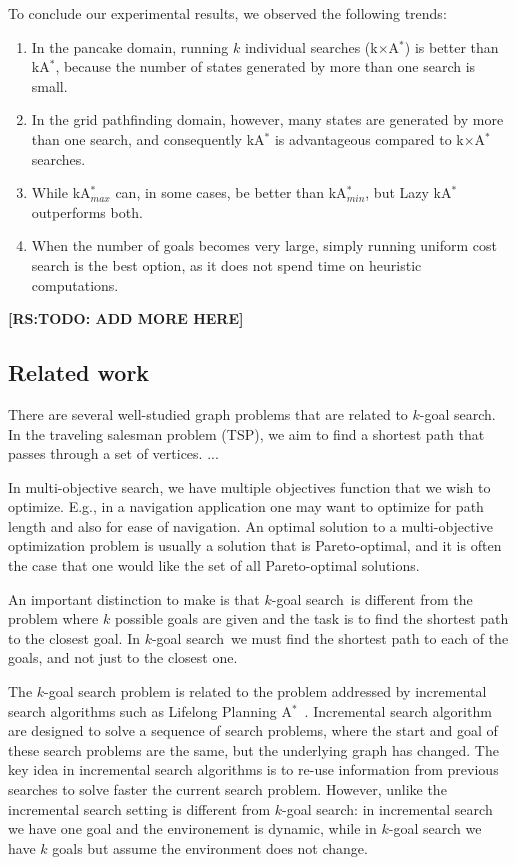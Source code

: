 \documentclass{aicom2e}
\newcommand{\kgs}{$k$-goal search}
\newcommand{\astar}{A$^*$}
\newcommand{\kastar}{kA$^*$}
\newcommand{\kastarmin}{kA$^*_{min}$}
\newcommand{\kastarmax}{kA$^*_{max}$}
\newcommand{\kxastar}{k$\times$A$^*$}
\newcommand{\roni}[1]{\textbf{[RS:#1]}}
\begin{document}
To conclude our experimental results, we observed the following trends:
\begin{enumerate}
	\item In the pancake domain, running $k$ individual searches (\kxastar{}) is better than \kastar{}, because the number of states generated by more than one search is small.
	\item In the grid pathfinding domain, however, many states are generated by more than one search, and consequently \kastar{} is advantageous compared to \kxastar{} searches. 
	\item While \kastarmax{} can, in some cases, be better than \kastarmin{}, but Lazy \kastar{} outperforms both. 
	\item When the number of goals becomes very large, simply running uniform cost search is the best option, as it does not spend time on heuristic computations. 
\end{enumerate}

\roni{TODO: ADD MORE HERE}




\subsection{Related work}
\label{sec:related-work}

There are several well-studied graph problems that are related to $k$-goal search. In the traveling salesman problem (TSP), we aim to find a shortest path that passes through a set of vertices. 
...

In multi-objective search, we have multiple objectives function that we wish to optimize. E.g., in a navigation application one may want to optimize for path length and also for ease of navigation. An optimal 
solution to a multi-objective optimization problem is usually a solution that is Pareto-optimal, and it is often the case that one would like the set of all Pareto-optimal solutions. 


An important distinction to make is that \kgs\ is different from the problem where $k$ possible goals are given and the task is to find the shortest path to the closest goal. In \kgs\ we must find the shortest path to each of the goals, and not just to the closest one. 


The \kgs{} problem is related to the problem addressed by incremental search algorithms such as Lifelong Planning \astar{}~\cite{koenig2004lifelong}. Incremental search algorithm are designed to solve a sequence of search problems, where the start and goal of these search problems are the same, but the underlying graph has changed. The key idea in incremental search algorithms is to re-use information from previous searches to solve faster the current search problem. However, unlike the incremental search setting is different from \kgs{}: in incremental search we have one goal and the environement is dynamic, while in \kgs{} we have $k$ goals but assume the environment does not change. 
\end{document}
